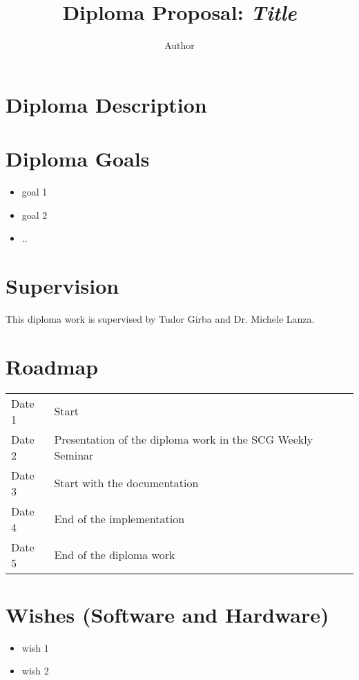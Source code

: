 \documentclass[11pt]{article}
\begin{document}
\title{Diploma Proposal: \emph{Title}}

\author{Author}

\maketitle

\section*{Diploma Description}

\section*{Diploma Goals}

\begin{itemize}

\item goal 1 

\item goal 2

\item .. 

\end{itemize}

\section*{Supervision}

This diploma work is supervised by Tudor Girba and Dr. Michele Lanza. 

\section*{Roadmap}

\begin{tabular}[t]{l  l}
Date 1 & Start \\
Date 2 & Presentation of the diploma work in the SCG Weekly Seminar \\
Date 3 & Start with the documentation \\
Date 4 & End of the implementation \\
Date 5 & End of the diploma work \\
\end{tabular}

\section*{Wishes (Software and Hardware)}

\begin{itemize}
\item wish 1
\item wish 2 
\end{itemize}



\end{document}
